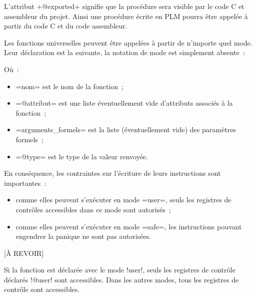 L'attribut \plm+@exported+ signifie que la procédure sera visible par le code C et assembleur du projet. Ainsi une procédure écrite en PLM pourra être appelée à partir du code C et du code assembleur.







Les fonctions universelles peuvent être appelées à partir de n'importe quel mode. Leur déclaration est la suivante, la notation de mode est simplement absente~:

Où~:
\begin{itemize}
  \item \plm=nom= est le nom de la fonction~;
  \item \plm=@attribut= est une liste éventuellement vide d'attributs associés à la fonction~;
  \item \plm=arguments_formels= est la liste (éventuellement vide) des paramètres formels~;
  \item \plm=@type= est le type de la valeur renvoyée.
\end{itemize}

En conséquence, les contraintes sur l'écriture de leurs instructions sont importantes~:
\begin{itemize}
  \item comme elles peuvent s'exécuter en mode \plm=user=, seuls les registres de contrôles accessibles dans ce mode sont autorisés~;
  \item comme elles peuvent s'exécuter en mode \plm=safe=, les instructions pouvant engendrer la panique ne sont pas autorisées.
\end{itemize}














[À REVOIR]

Si la fonction est déclarée avec le mode \plm!user!, seuls les registres de contrôle déclarés \plm!@user! sont accessibles. Dans les autres modes, tous les registres de contrôle sont accessibles.


